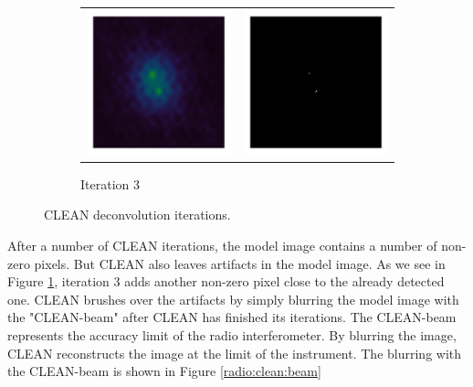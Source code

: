 \begin{figure}[h]
\begin{subfigure}[b]{0.45\linewidth}
	\end{subfigure}
		\begin{subfigure}[b]{0.45\linewidth}
		\begin{tabular}{c c}
			\includegraphics[width=0.45\linewidth, clip, trim= 1.0in 1.0in 1.0in 1.0in]{./chapters/01.intro/cleanExample/dirty_CLEAN_3.png} & \includegraphics[width=0.45\linewidth, clip, trim= 1.0in 1.0in 1.0in 1.0in]{./chapters/01.intro/cleanExample/model_CLEAN_3.png} 
		\end{tabular}
		\caption{Iteration 3}
		\label{radio:clean:figure:iter3}
	\end{subfigure}

	\caption{CLEAN deconvolution iterations.}
	\label{radio:clean:figure}
\end{figure}

After a number of CLEAN iterations, the model image contains a number of non-zero pixels. But CLEAN also leaves artifacts in the model image. As we see in Figure \ref{radio:clean:figure:iter3}, iteration 3 adds another non-zero pixel close to the already detected one. CLEAN brushes over the artifacts by simply blurring the model image with the "CLEAN-beam" after CLEAN has finished its iterations. The CLEAN-beam represents the accuracy limit of the radio interferometer. By blurring the image, CLEAN reconstructs the image at the limit of the instrument. The blurring with the CLEAN-beam is shown in Figure \ref{radio:clean:beam}

